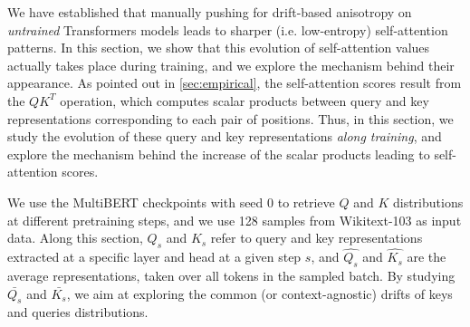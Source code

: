 We have established that manually pushing for drift-based anisotropy on \textit{untrained} Transformers models leads to sharper (i.e. low-entropy) self-attention patterns. In this section, we show that this evolution of self-attention values actually takes place during training, and we explore the mechanism behind their appearance. As pointed out in \autoref{sec:empirical}, the self-attention scores result from the $QK^T$ operation, which computes scalar products between query and key representations corresponding to each pair of positions. Thus, in this section, we study the evolution of these query and key representations \textit{along training}, and explore the mechanism behind the increase of the scalar products leading to self-attention scores.

We use the MultiBERT checkpoints \citep{sellam2021multiberts} with seed 0 to retrieve $Q$ and $K$ distributions at different pretraining steps, and we use 128 samples from Wikitext-103 as input data. Along this section, $Q_s$ and $K_s$ refer to query and key representations extracted at a specific layer and head at a given step $s$, and $\hat{Q_s}$ and $\hat{K_s}$ are the average representations, taken over all tokens in the sampled batch. By studying $\bar{Q_s}$ and $\bar{K_s}$, we aim at exploring the common (or context-agnostic) drifts of keys and queries distributions.

